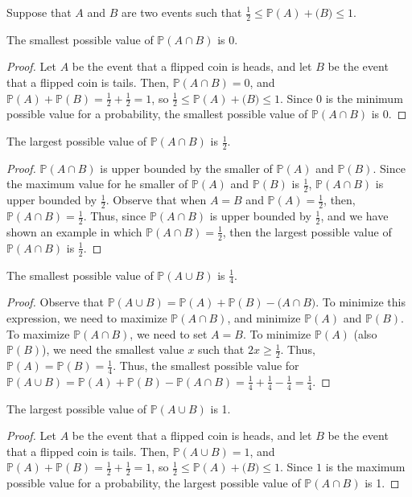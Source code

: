 \documentclass[12pt]{article}
\begin{document}
\newpage
{} Suppose that $A$ and $B$ are two events such that $\frac12 \leq \mathbb P(A) + \mathbb(B) \leq 1$.

 The smallest possible value of $\mathbb P(A \cap B)$ is 0.

\begin{proof}
    Let $A$ be the event that a flipped coin is heads, and let $B$ be the event that a flipped coin is tails. Then, $\mathbb P(A \cap B) = 0$, and $\mathbb P(A) + \mathbb P(B) = \frac12 + \frac12 = 1$, so $\frac12 \leq \mathbb P(A) + \mathbb(B) \leq 1$. Since $0$ is the minimum possible value for a probability, the smallest possible value of $\mathbb P(A \cap B)$ is 0.
\end{proof}

\medskip
{} The largest possible value of $\mathbb P(A \cap B)$ is $\frac12$.

\begin{proof}
    $\mathbb P(A \cap B)$ is upper bounded by the smaller of $\mathbb P(A)$ and $\mathbb P(B)$. Since the maximum value for he smaller of $\mathbb P(A)$ and $\mathbb P(B)$ is $\frac12$, $\mathbb P(A \cap B)$ is upper bounded by $\frac12$. Observe that when $A = B$ and $\mathbb P(A) = \frac12$, then, $\mathbb P(A \cap B) = \frac12$. Thus, since $\mathbb P(A \cap B)$ is upper bounded by $\frac12$, and we have shown an example in which $\mathbb P(A \cap B) = \frac12$, then the largest possible value of $\mathbb P(A \cap B)$ is $\frac12$. 
\end{proof}

\medskip
{} The smallest possible value of $\mathbb P(A \cup B)$ is $\frac14$.

\begin{proof}
    Observe that $\mathbb P(A \cup B) = \mathbb P(A) + \mathbb P(B) - \mathbb(A \cap B)$. To minimize this expression, we need to maximize $\mathbb P(A \cap B)$, and minimize $\mathbb P(A)$ and $\mathbb P(B)$. To maximize $\mathbb P(A \cap B)$, we need to set $A = B$. To minimize $\mathbb P(A)$ (also $\mathbb P(B)$), we need the smallest value $x$ such that $2x \geq \frac12$. Thus, $\mathbb P(A) = \mathbb P(B) = \frac14$. Thus, the smallest possible value for $\mathbb P(A \cup B) = \mathbb P(A) + \mathbb P(B) - \mathbb P(A \cap B) = \frac14 + \frac14 - \frac14 = \frac14$.
\end{proof}

\medskip
{} The largest possible value of $\mathbb P(A \cup B)$ is 1.

\begin{proof}
    Let $A$ be the event that a flipped coin is heads, and let $B$ be the event that a flipped coin is tails. Then, $\mathbb P(A \cup B) = 1$, and $\mathbb P(A) + \mathbb P(B) = \frac12 + \frac12 = 1$, so $\frac12 \leq \mathbb P(A) + \mathbb(B) \leq 1$. Since $1$ is the maximum possible value for a probability, the largest possible value of $\mathbb P(A \cap B)$ is 1.
\end{proof}
\end{document}

